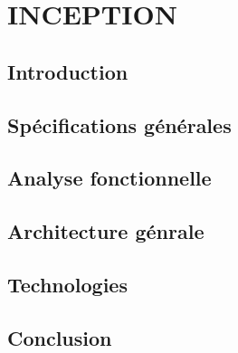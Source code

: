 \setcounter{chapter}{2}
\chapter{INCEPTION}
\minitoc %
\graphicspath{{Chapitre3/figures/}}


\pagestyle{fancy}
\fancyhf{}
\fancyhead[R]{\bfseries\rightmark}
\fancyfoot[R]{\thepage}
\renewcommand{\headrulewidth}{0.5pt}
\renewcommand{\footrulewidth}{0pt}
\renewcommand{\chaptermark}[1]{\markboth{\MakeUppercase{\chaptername~\thechapter. #1 }}{}}
\renewcommand{\sectionmark}[1]{\markright{\thechapter.\thesection~ #1}}

\begin{spacing}{1.5}

\section*{Introduction}


\section{Spécifications générales}


\section{Analyse fonctionnelle}


\section{Architecture génrale}



\section{Technologies}


\section*{Conclusion}


\end{spacing}
